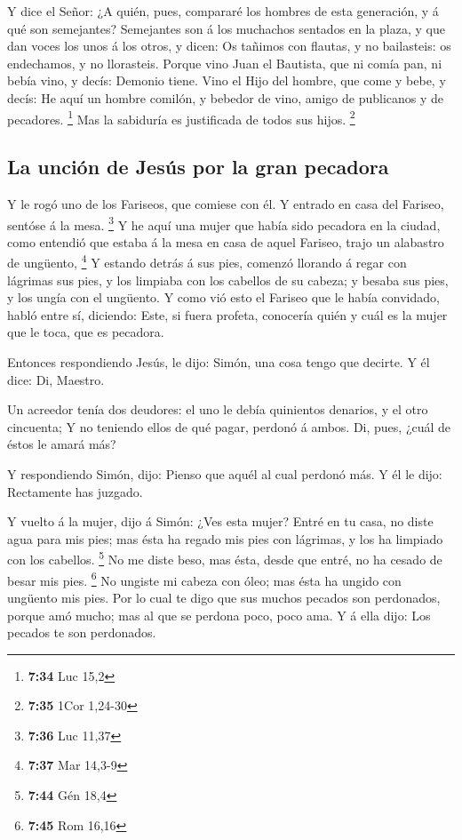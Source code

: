  Y dice el Señor: ¿A quién, pues, compararé los hombres
de esta generación, y á qué son semejantes?  Semejantes
son á los muchachos sentados en la plaza, y que dan voces los unos á los
otros, y dicen: Os tañimos con flautas, y no bailasteis: os endechamos,
y no llorasteis.  Porque vino Juan el Bautista, que ni
comía pan, ni bebía vino, y decís: Demonio tiene.  Vino
el Hijo del hombre, que come y bebe, y decís: He aquí un hombre comilón,
y bebedor de vino, amigo de publicanos y de pecadores. \footnote{\textbf{7:34}
  Luc 15,2}  Mas la sabiduría es justificada de todos sus
hijos. \footnote{\textbf{7:35} 1Cor 1,24-30}

\hypertarget{la-unciuxf3n-de-jesuxfas-por-la-gran-pecadora}{%
\subsection{La unción de Jesús por la gran
pecadora}\label{la-unciuxf3n-de-jesuxfas-por-la-gran-pecadora}}

 Y le rogó uno de los Fariseos, que comiese con él. Y
entrado en casa del Fariseo, sentóse á la mesa. \footnote{\textbf{7:36}
  Luc 11,37}  Y he aquí una mujer que había sido pecadora
en la ciudad, como entendió que estaba á la mesa en casa de aquel
Fariseo, trajo un alabastro de ungüento, \footnote{\textbf{7:37} Mar
  14,3-9}  Y estando detrás á sus pies, comenzó llorando
á regar con lágrimas sus pies, y los limpiaba con los cabellos de su
cabeza; y besaba sus pies, y los ungía con el ungüento. 
Y como vió esto el Fariseo que le había convidado, habló entre sí,
diciendo: Este, si fuera profeta, conocería quién y cuál es la mujer que
le toca, que es pecadora.

 Entonces respondiendo Jesús, le dijo: Simón, una cosa
tengo que decirte. Y él dice: Di, Maestro.

 Un acreedor tenía dos deudores: el uno le debía
quinientos denarios, y el otro cincuenta;  Y no teniendo
ellos de qué pagar, perdonó á ambos. Di, pues, ¿cuál de éstos le amará
más?

 Y respondiendo Simón, dijo: Pienso que aquél al cual
perdonó más. Y él le dijo: Rectamente has juzgado.

 Y vuelto á la mujer, dijo á Simón: ¿Ves esta mujer?
Entré en tu casa, no diste agua para mis pies; mas ésta ha regado mis
pies con lágrimas, y los ha limpiado con los cabellos. \footnote{\textbf{7:44}
  Gén 18,4}  No me diste beso, mas ésta, desde que entré,
no ha cesado de besar mis pies. \footnote{\textbf{7:45} Rom 16,16}
 No ungiste mi cabeza con óleo; mas ésta ha ungido con
ungüento mis pies.  Por lo cual te digo que sus muchos
pecados son perdonados, porque amó mucho; mas al que se perdona poco,
poco ama.  Y á ella dijo: Los pecados te son perdonados.


